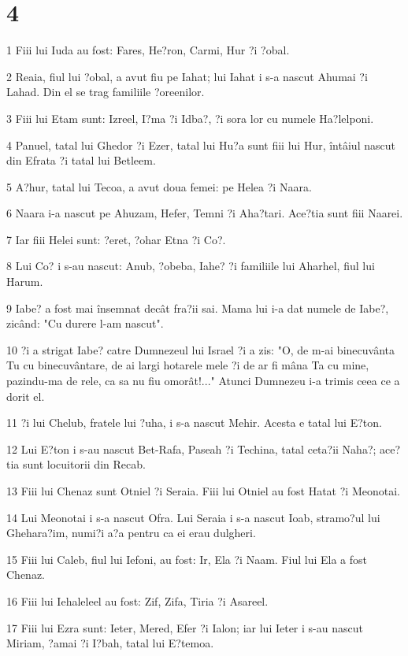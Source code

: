 \chapter{4}

\par 1 Fiii lui Iuda au fost: Fares, He?ron, Carmi, Hur ?i ?obal.
\par 2 Reaia, fiul lui ?obal, a avut fiu pe Iahat; lui Iahat i s-a nascut Ahumai ?i Lahad. Din el se trag familiile ?oreenilor.
\par 3 Fiii lui Etam sunt: Izreel, I?ma ?i Idba?, ?i sora lor cu numele Ha?lelponi.
\par 4 Panuel, tatal lui Ghedor ?i Ezer, tatal lui Hu?a sunt fiii lui Hur, întâiul nascut din Efrata ?i tatal lui Betleem.
\par 5 A?hur, tatal lui Tecoa, a avut doua femei: pe Helea ?i Naara.
\par 6 Naara i-a nascut pe Ahuzam, Hefer, Temni ?i Aha?tari. Ace?tia sunt fiii Naarei.
\par 7 Iar fiii Helei sunt: ?eret, ?ohar Etna ?i Co?.
\par 8 Lui Co? i s-au nascut: Anub, ?obeba, Iahe? ?i familiile lui Aharhel, fiul lui Harum.
\par 9 Iabe? a fost mai însemnat decât fra?ii sai. Mama lui i-a dat numele de Iabe?, zicând: "Cu durere l-am nascut".
\par 10 ?i a strigat Iabe? catre Dumnezeul lui Israel ?i a zis: "O, de m-ai binecuvânta Tu cu binecuvântare, de ai largi hotarele mele ?i de ar fi mâna Ta cu mine, pazindu-ma de rele, ca sa nu fiu omorât!..." Atunci Dumnezeu i-a trimis ceea ce a dorit el.
\par 11 ?i lui Chelub, fratele lui ?uha, i s-a nascut Mehir. Acesta e tatal lui E?ton.
\par 12 Lui E?ton i s-au nascut Bet-Rafa, Paseah ?i Techina, tatal ceta?ii Naha?; ace?tia sunt locuitorii din Recab.
\par 13 Fiii lui Chenaz sunt Otniel ?i Seraia. Fiii lui Otniel au fost Hatat ?i Meonotai.
\par 14 Lui Meonotai i s-a nascut Ofra. Lui Seraia i s-a nascut Ioab, stramo?ul lui Ghehara?im, numi?i a?a pentru ca ei erau dulgheri.
\par 15 Fiii lui Caleb, fiul lui Iefoni, au fost: Ir, Ela ?i Naam. Fiul lui Ela a fost Chenaz.
\par 16 Fiii lui Iehaleleel au fost: Zif, Zifa, Tiria ?i Asareel.
\par 17 Fiii lui Ezra sunt: Ieter, Mered, Efer ?i Ialon; iar lui Ieter i s-au nascut Miriam, ?amai ?i I?bah, tatal lui E?temoa.

